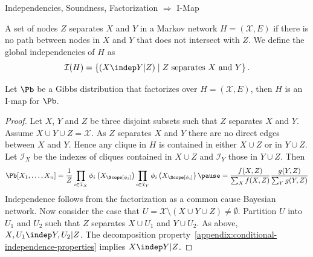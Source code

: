 \begin{frame}{Independencies, Soundness, Factorization $\Rightarrow$ I-Map}
\begin{definition}[Separation]
    A set of nodes $Z$ separates $X$ and $Y$ in a Markov network $H = (\mathcal{X},E)$ if there is no path between nodes in $X$ and $Y$ that does not intersect with $Z$.
    We define the global independencies of $H$ as 
    \begin{equation}
        \mathcal{I}(H) = \{(X \indep Y | Z) \mid Z \text{ separates } X \text{ and } Y\}\,.
    \end{equation}
\end{definition}
\pause
\begin{theorem}
    Let $\Pb$ be a Gibbs distribution that factorizes over $H = (\mathcal{X},E)$, then $H$ is an I-map for $\Pb$.
\end{theorem}
\pause
\begin{proof}
Let $X$, $Y$ and $Z$ be three disjoint subsets such that $Z$ separates $X$ and $Y$.
Assume $X \cup Y \cup Z = \mathcal{X}$.
\pause
As $Z$ separates $X$ and $Y$ there are no direct edges between $X$ and $Y$.
\pause
Hence any clique in $H$ is contained in either $X \cup Z$ or in $Y \cup Z$.
\pause
Let $\mathcal{I}_X$ be the indexes of cliques contained in $X \cup Z$ and $\mathcal{I}_Y$ those in $Y \cup Z$.
\pause
Then 
\begin{equation}
    \Pb[X_1,\ldots,X_n] =
     \frac{1}{Z} \prod_{i \in \mathcal{I}_X} \phi_i\left(X_{\Scope[\phi_i]}\right) \prod_{i \in \mathcal{I}_Y} \phi_i\left(X_{\Scope[\phi_i]}\right) 
     \pause 
     = \frac{f(X,Z)}{\sum_{X} f(X,Z)} \frac{g(Y,Z)}{\sum_{Y} g(Y,Z)}
\end{equation}
\pause
Independence follows from the factorization as a common cause Bayesian network.
\pause
Now consider the case that $U = \mathcal{X} \setminus (X \cup Y \cup Z) \neq \emptyset$.
\pause 
Partition $U$ into $U_1$ and $U_2$ such that $Z$ separates $X \cup U_1$ and $Y \cup U_2$.
\pause 
As above, $X,U_1 \indep Y, U_2 | Z$. 
\pause 
The decomposition property~\eqref{appendix:conditional-independence-properties} implies $X \indep Y | Z$.
\end{proof}
\end{frame}


